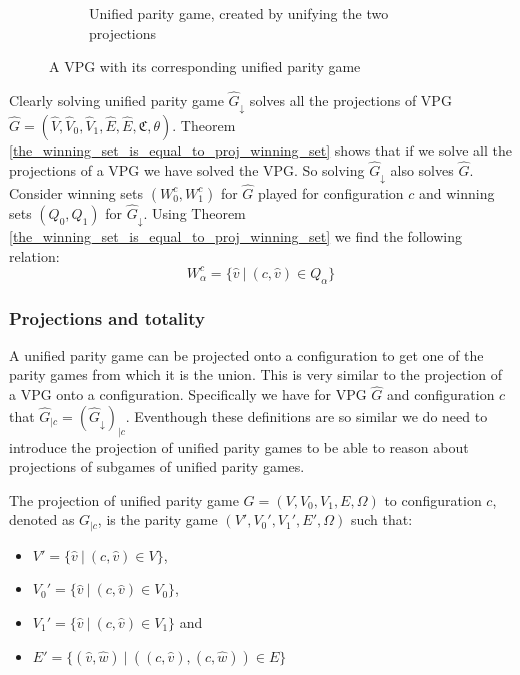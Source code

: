 \begin{example}
\begin{figure}[h]
\begin{subfigure}{1\textwidth}
			\caption{Unified parity game, created by unifying the two projections}
		\end{subfigure}
		\caption{A VPG with its corresponding unified parity game}
		\label{fig:VPG2UPG}
	\end{figure}
\end{example}

Clearly solving unified parity game $\hat{G}_{\downarrow}$ solves all the projections of VPG $\hat{G} = (\hat{V},\hat{V}_0,\hat{V}_1,\hat{E},\hat{E},\mathfrak{C},\theta)$. Theorem \ref{the_winning_set_is_equal_to_proj_winning_set} shows that if we solve all the projections of a VPG we have solved the VPG. So solving $\hat{G}_{\downarrow}$ also solves $\hat{G}$. Consider winning sets $(W^c_0, W^c_1)$ for $\hat{G}$ played for configuration $c$ and winning sets $(Q_0,Q_1)$ for $\hat{G}_{\downarrow}$. Using Theorem \ref{the_winning_set_is_equal_to_proj_winning_set} we find the following relation:
\[ W^c_\alpha = \{\hat{v}\ |\ (c,\hat{v}) \in Q_\alpha\} \]
\subsubsection{Projections and totality}
A unified parity game can be projected onto a configuration to get one of the parity games from which it is the union. This is very similar to the projection of a VPG onto a configuration. Specifically we have for VPG $\hat{G}$ and configuration $c$ that $\hat{G}_{|c} = (\hat{G}_{\downarrow})_{|c}$. Eventhough these definitions are so similar we do need to introduce the projection of unified parity games to be able to reason about projections of subgames of unified parity games.
\begin{definition}
	The projection of unified parity game $G = (V,V_0, V_1,E,{\Omega})$ to configuration $c$, denoted as $G_{|c}$, is the parity game $(V',V_0',V_1',E',\Omega)$ such that:
	\begin{itemize}
		\item $V' = \{\hat{v}\ |\ (c,\hat{v}) \in V \}$,
		\item $V_0' = \{\hat{v}\ |\ (c,\hat{v}) \in V_0 \}$,
		\item $V_1' = \{\hat{v}\ |\ (c,\hat{v}) \in V_1 \}$ and
		\item $E' = \{ (\hat{v},\hat{w})\ |\ ((c,\hat{v}),(c,\hat{w})) \in E \} $
	\end{itemize}
\end{definition}

